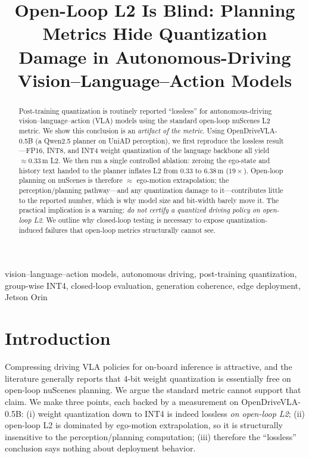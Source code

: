 \documentclass[conference]{IEEEtran}
\title{\textbf{Open-Loop L2 Is Blind: Planning Metrics Hide Quantization\\
Damage in Autonomous-Driving Vision--Language--Action Models}}
\author{\IEEEauthorblockN{Justin Williams, Kishor Datta Gupta, Roy George, Mrinmoy Sarkar}
\IEEEauthorblockA{Clark Atlanta University \\ \texttt{justinwilliamstech693@gmail.com}}}
\begin{document}
\maketitle

\begin{abstract}
Post-training quantization is routinely reported ``lossless'' for autonomous-driving
vision--language--action (VLA) models using the standard open-loop nuScenes L2 metric. We
show this conclusion is an \emph{artifact of the metric}. Using OpenDriveVLA-0.5B (a Qwen2.5
planner on UniAD perception), we first reproduce the lossless result---FP16, INT8, and INT4
weight quantization of the language backbone all yield $\approx 0.33$\,m L2. We then run a
single controlled ablation: zeroing the ego-state and history text handed to the planner
inflates L2 from $0.33$ to $6.38$\,m ($19\times$). Open-loop planning on nuScenes is therefore
$\approx$ ego-motion extrapolation; the perception/planning pathway---and any quantization
damage to it---contributes little to the reported number, which is why model size and bit-width
barely move it. The practical implication is a warning: \emph{do not certify a quantized driving
policy on open-loop L2}. We outline why closed-loop testing is necessary to expose
quantization-induced failures that open-loop metrics structurally cannot see.
\end{abstract}
\begin{IEEEkeywords}
vision--language--action models, autonomous driving, post-training quantization, group-wise INT4, closed-loop evaluation, generation coherence, edge deployment, Jetson Orin
\end{IEEEkeywords}

\section{Introduction}
Compressing driving VLA policies for on-board inference is attractive, and the literature
generally reports that 4-bit weight quantization is essentially free on open-loop nuScenes
planning. We argue the standard metric cannot support that claim. We make three points, each
backed by a measurement on OpenDriveVLA-0.5B: (i) weight quantization down to INT4 is indeed
lossless \emph{on open-loop L2}; (ii) open-loop L2 is dominated by ego-motion extrapolation, so
it is structurally insensitive to the perception/planning computation; (iii) therefore the
``lossless'' conclusion says nothing about deployment behavior.
\end{document}
